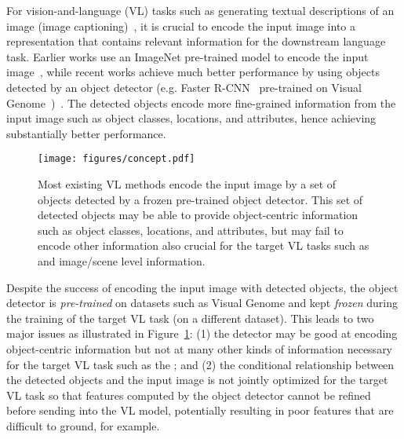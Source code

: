 \documentclass[10pt,twocolumn,letterpaper]{article}
\begin{document}

For vision-and-language (VL) tasks such as generating textual descriptions of an image (image captioning)~\cite{karpathy2015deep,anderson2018bottom,cornia2020meshed}, it is crucial to encode the input image into a representation that contains relevant information for the downstream language task.
Earlier works use an ImageNet pre-trained model to encode the input image~\cite{vinyals2015show,karpathy2015deep}, while recent works achieve much better performance by using objects detected by an object detector (e.g. Faster R-CNN~\cite{ren2015faster} pre-trained on Visual Genome~\cite{krishnavisualgenome})~\cite{anderson2018bottom,ke2019reflective,qin2019look}.
The detected objects encode more fine-grained information from the input image such as object classes,
locations, and attributes, 
hence achieving substantially better performance.

\begin{figure}
\centering
\texttt{[image: figures/concept.pdf]}
\caption{
Most existing VL methods encode the input image by a set of objects detected by a frozen pre-trained object detector.
This set of detected objects may be able to provide object-centric information such as object classes, locations, and attributes, but may fail to encode other information also crucial for the target VL tasks such as  and image/scene level information.
}
\label{figure:concept}
\end{figure}

Despite the success of encoding the input image with detected objects, the object detector is \textit{pre-trained} on datasets such as Visual Genome and kept \textit{frozen} during the training of the target VL task (on a different dataset).
This leads to two major issues as illustrated in Figure~\ref{figure:concept}:
(1) the detector may be good at encoding object-centric information but not at many other kinds of information necessary for the target VL task such as the ;
and
(2) the conditional relationship between the detected objects and the input image is not jointly optimized for the target VL task so that features computed by the object detector cannot
be refined before sending into the VL model, potentially resulting in poor features that are difficult to ground, for example.
\end{document}
